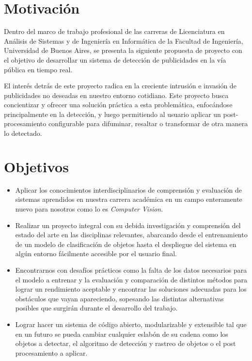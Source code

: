 \documentclass[a4paper]{article}
\begin{document}
\restoregeometry
\tableofcontents
\newpage

\section{Motivación}
Dentro del marco de trabajo profesional de las carreras de Licenciatura en Análisis de Sistemas y de Ingeniería en Informática de la Facultad de Ingeniería, Universidad de Buenos Aires, se presenta la siguiente propuesta de proyecto con el objetivo de desarrollar un sistema de detección de publicidades en la vía pública en tiempo real.

El interés detrás de este proyecto radica en la creciente intrusión e invasión de publicidades no deseadas en nuestro entorno cotidiano. Este proyecto busca concientizar y ofrecer una solución práctica a esta problemática, enfocándose principalmente en la detección, y luego permitiendo al usuario aplicar un post-procesamiento configurable para difuminar, resaltar o transformar de otra manera lo detectado.

\section{Objetivos}
\begin{itemize}
    \item Aplicar los conocimientos interdisciplinarios de comprensión y evaluación de sistemas aprendidos en nuestra carrera académica en un campo enteramente nuevo para nosotros como lo es \emph{Computer Vision}.
    \item Realizar un proyecto integral con su debida investigación y comprensión del estado del arte en las disciplinas relevantes, abarcando desde el entrenamiento de un modelo de clasificación de objetos hasta el despliegue del sistema en algún entorno fácilmente accesible por el usuario final.
    \item Encontrarnos con desafíos prácticos como la falta de los datos necesarios para el modelo a entrenar y la evaluación y comparación de distintos métodos para lograr un rendimiento aceptable y encontrar las soluciones adecuadas para los obstáculos que vayan apareciendo, sopesando las distintas alternativas posibles que surgirán durante el desarrollo del trabajo.
    \item Lograr hacer un sistema de código abierto, modularizable y extensible tal que en un futuro se pueda cambiar cualquier eslabón de su cadena como los objetos a detectar, el algoritmo de detección y rastreo de objetos o el post procesamiento a aplicar.
\end{itemize}
\end{document}

